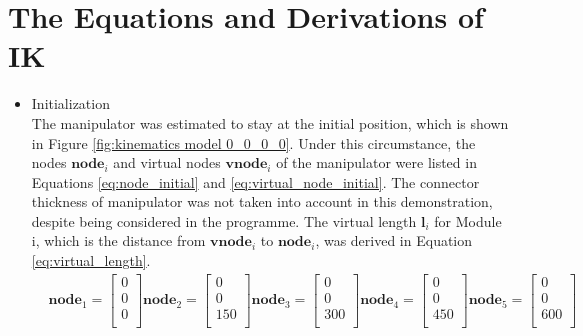 \section*{The Equations and Derivations of IK}
\label{sec:IK}
\begin{itemize}
    \item Initialization \\
    The manipulator was estimated to stay at the initial position, which is shown in Figure 
    \ref{fig:kinematics model 0_0_0_0}. Under this circumstance, the nodes $\textbf{node}_{i}$ and 
    virtual nodes $\textbf{vnode}_{i}$ of the manipulator were listed in Equations \ref{eq:node_initial} and 
    \ref{eq:virtual_node_initial}. The connector thickness of manipulator was not taken into account in this 
    demonstration, despite being considered in the programme. The virtual length $\textbf{l}_{i}$ for Module i, which 
    is the distance from $\textbf{vnode}_{i}$ to $\textbf{node}_{i}$, was derived in Equation \ref{eq:virtual_length}.
    \vspace{-5mm}
    \begin{align}
        & \textbf{node}_{1} = \begin{bmatrix} 0 \\ 0 \\ 0 \\ \end{bmatrix} 
        \textbf{node}_{2} = \begin{bmatrix} 0 \\ 0 \\ 150 \\ \end{bmatrix} 
        \textbf{node}_{3} = \begin{bmatrix} 0 \\ 0 \\ 300 \\ \end{bmatrix} 
        \textbf{node}_{4} = \begin{bmatrix} 0 \\ 0 \\ 450 \\ \end{bmatrix} 
        \textbf{node}_{5} = \begin{bmatrix} 0 \\ 0 \\ 600 \\ \end{bmatrix} 
        \label{eq:node_initial} \\

\end{align}
\end{itemize}
